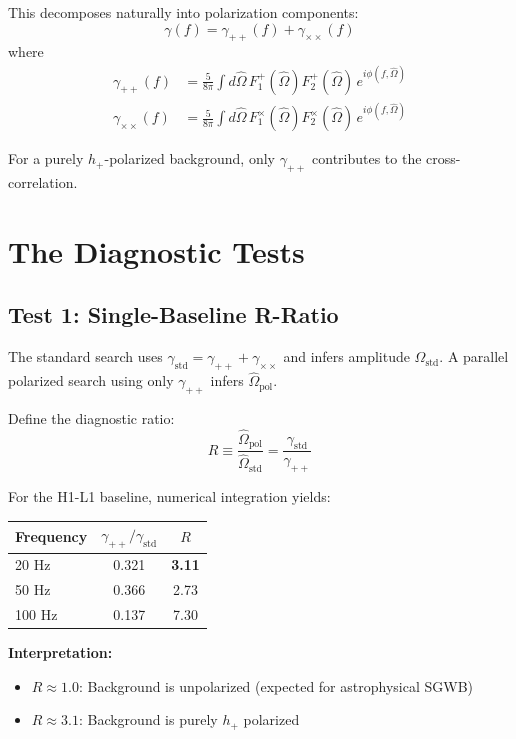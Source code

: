 \documentclass[twocolumn,prd,superscriptaddress,nofootinbib]{revtex4-2}
\begin{document}
This decomposes naturally into polarization components:
\begin{equation}
\gamma(f) = \gamma_{++}(f) + \gamma_{\times\times}(f)
\end{equation}
where
\begin{align}
\gamma_{++}(f) &= \frac{5}{8\pi} \int d\hat{\Omega} \, F_1^+(\hat{\Omega}) F_2^+(\hat{\Omega}) \, e^{i\phi(f,\hat{\Omega})} \\
\gamma_{\times\times}(f) &= \frac{5}{8\pi} \int d\hat{\Omega} \, F_1^\times(\hat{\Omega}) F_2^\times(\hat{\Omega}) \, e^{i\phi(f,\hat{\Omega})}
\end{align}

For a purely $h_+$-polarized background, only $\gamma_{++}$ contributes to the cross-correlation.

\section{The Diagnostic Tests}

\subsection{Test 1: Single-Baseline R-Ratio}

The standard search uses $\gamma_{\mathrm{std}} = \gamma_{++} + \gamma_{\times\times}$ and infers amplitude $\hat{\Omega}_{\mathrm{std}}$. A parallel polarized search using only $\gamma_{++}$ infers $\hat{\Omega}_{\mathrm{pol}}$.

Define the diagnostic ratio:
\begin{equation}
\boxed{R \equiv \frac{\hat{\Omega}_{\mathrm{pol}}}{\hat{\Omega}_{\mathrm{std}}} = \frac{\gamma_{\mathrm{std}}}{\gamma_{++}}}
\end{equation}

For the H1-L1 baseline, numerical integration yields:

\begin{center}
\begin{tabular}{lcc}
\hline
Frequency & $\gamma_{++}/\gamma_{\mathrm{std}}$ & $R$ \\
\hline
20 Hz & 0.321 & \textbf{3.11} \\
50 Hz & 0.366 & 2.73 \\
100 Hz & 0.137 & 7.30 \\
\hline
\end{tabular}
\end{center}

\textbf{Interpretation:}
\begin{itemize}
\item $R \approx 1.0$: Background is unpolarized (expected for astrophysical SGWB)
\item $R \approx 3.1$: Background is purely $h_+$ polarized
\end{itemize}
\end{document}
